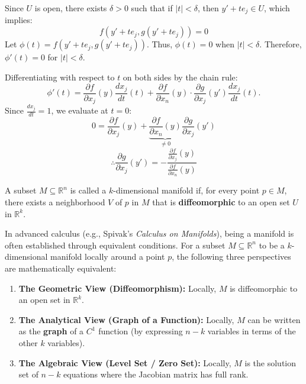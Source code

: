 \begin{pfbox}
Since $U$ is open, there exists $\delta > 0$ such that if $|t| < \delta$, then $y' + t e_j \in U$, which implies:
$$ f(y' + t e_j, g(y' + t e_j)) = 0 $$
Let $\phi(t) = f(y' + t e_j, g(y' + t e_j))$. Thus, $\phi(t) = 0$ when $|t| < \delta$.
Therefore, $\phi'(t) = 0$ for $|t| < \delta$.

Differentiating with respect to $t$ on both sides by the chain rule:
$$ \phi'(t) = \frac{\partial f}{\partial x_j}(y) \frac{dx_j}{dt}(t) + \frac{\partial f}{\partial x_n}(y) \cdot \frac{\partial g}{\partial x_j}(y') \frac{dx_j}{dt}(t).$$
Since $\frac{dx_j}{dt} = 1$, we evaluate at $t=0$:
$$ 0 = \frac{\partial f}{\partial x_j}(y) + \underbrace{\frac{\partial f}{\partial x_n}(y)}_{\neq 0} \frac{\partial g}{\partial x_j}(y') $$
$$ \therefore \frac{\partial g}{\partial x_j}(y') = - \frac{\frac{\partial f}{\partial x_j}(y)}{\frac{\partial f}{\partial x_n}(y)} $$


\end{pfbox}



\begin{definition}[Manifold]
A subset $M \subseteq \mathbb{R}^n$ is called a $k$-dimensional manifold if, for every point $p \in M$, there exists a neighborhood $V$ of $p$ in $M$ that is \textbf{diffeomorphic} to an open set $U$ in $\mathbb{R}^k$.
\end{definition}

\begin{remark}
In advanced calculus (e.g., Spivak's \textit{Calculus on Manifolds}), being a manifold is often established through equivalent conditions. For a subset $M \subseteq \mathbb{R}^n$ to be a $k$-dimensional manifold locally around a point $p$, the following three perspectives are mathematically equivalent:

\begin{enumerate}
    \item \textbf{The Geometric View (Diffeomorphism):} Locally, $M$ is diffeomorphic to an open set in $\mathbb{R}^k$.
    \item \textbf{The Analytical View (Graph of a Function):} Locally, $M$ can be written as the \textbf{graph} of a $C^1$ function (by expressing $n-k$ variables in terms of the other $k$ variables).
    \item \textbf{The Algebraic View (Level Set / Zero Set):} Locally, $M$ is the solution set of $n-k$ equations where the Jacobian matrix has full rank.
\end{enumerate}
\end{remark}

